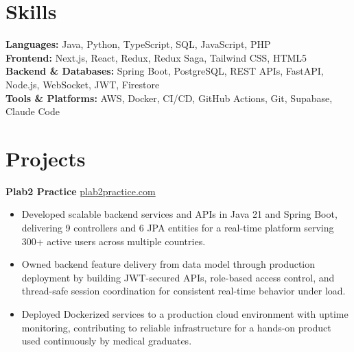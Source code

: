 \documentclass[11pt]{article}       %
\begin{document}
\vspace{-10.5pt}

\section*{Skills}
\textbf{Languages:} Java, Python, TypeScript, SQL, JavaScript, PHP \\
\textbf{Frontend:} Next.js, React, Redux, Redux Saga, Tailwind CSS, HTML5 \\
\textbf{Backend \& Databases:} Spring Boot, PostgreSQL, REST APIs, FastAPI, Node.js, WebSocket, JWT, Firestore \\
\textbf{Tools \& Platforms:} AWS, Docker, CI/CD, GitHub Actions, Git, Supabase, Claude Code
\vspace{-5pt}






\section*{Projects}
\textbf{Plab2 Practice} \hfill \href{https://plab2practice.com}{plab2practice.com} \\
\vspace{-9pt}
\begin{itemize}
  \item Developed scalable backend services and APIs in Java 21 and Spring Boot, delivering 9 controllers and 6 JPA entities for a real-time platform serving 300+ active users across multiple countries.
  \item Owned backend feature delivery from data model through production deployment by building JWT-secured APIs, role-based access control, and thread-safe session coordination for consistent real-time behavior under load.
  \item Deployed Dockerized services to a production cloud environment with uptime monitoring, contributing to reliable infrastructure for a hands-on product used continuously by medical graduates.
\end{itemize}
\end{document}
